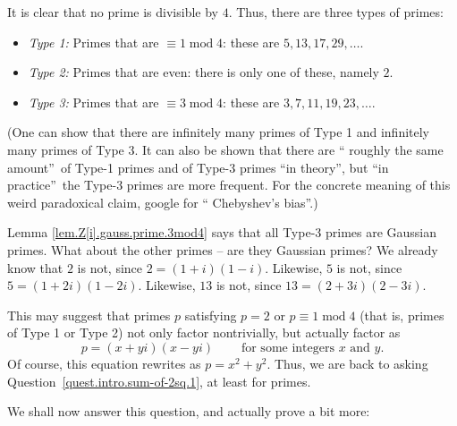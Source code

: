 \documentclass[numbers=enddot,12pt,final,onecolumn,notitlepage]{scrartcl}%
\numberwithin{exer}{subsection}
\theoremstyle{definition}
\begin{document}
It is clear that no prime is divisible by $4$. Thus, there are three types of primes:

\begin{itemize}
\item \textit{Type 1:} Primes that are $\equiv1\operatorname{mod}4$: these are
$5,13,17,29,\ldots$.

\item \textit{Type 2:} Primes that are even: there is only one of these,
namely $2$.

\item \textit{Type 3:} Primes that are $\equiv3\operatorname{mod}4$: these are
$3,7,11,19,23,\ldots$.
\end{itemize}

(One can show that there are infinitely many primes of Type 1 and infinitely
many primes of Type 3. It can also be shown that there are \textquotedblleft
roughly the same amount\textquotedblright\ of Type-1 primes and of Type-3
primes \textquotedblleft in theory\textquotedblright, but \textquotedblleft in
practice\textquotedblright\ the Type-3 primes are more frequent. For the
concrete meaning of this weird paradoxical claim, google for \textquotedblleft
Chebyshev's bias\textquotedblright.)

Lemma \ref{lem.Z[i].gauss.prime.3mod4} says that all Type-3 primes are
Gaussian primes. What about the other primes -- are they Gaussian primes? We
already know that $2$ is not, since $2=\left(  1+i\right)  \left(  1-i\right)
$. Likewise, $5$ is not, since $5=\left(  1+2i\right)  \left(  1-2i\right)  $.
Likewise, $13$ is not, since $13=\left(  2+3i\right)  \left(  2-3i\right)  $.

This may suggest that primes $p$ satisfying $p=2$ or $p\equiv
1\operatorname{mod}4$ (that is, primes of Type 1 or Type 2) not only factor
nontrivially, but actually factor as%
\[
p=\left(  x+yi\right)  \left(  x-yi\right)  \ \ \ \ \ \ \ \ \ \ \text{for some
integers }x\text{ and }y.
\]
Of course, this equation rewrites as $p=x^{2}+y^{2}$. Thus, we are back to
asking Question~\ref{quest.intro.sum-of-2sq.1}, at least for primes.

We shall now answer this question, and actually prove a bit more:
\end{document}
